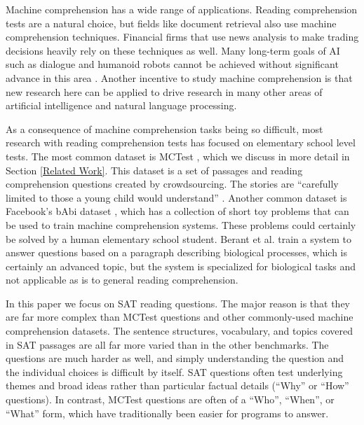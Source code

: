 \documentclass[pageno]{final_paper}
\begin{document}
Machine comprehension has a wide range of applications. Reading comprehension
tests are a natural choice, but fields like document retrieval also use machine
comprehension techniques. Financial firms that use news analysis to make
trading decisions heavily rely on these techniques as well. Many long-term
goals of AI such as dialogue and humanoid robots cannot be achieved without
significant advance in this area \cite{Weston2015}. Another incentive to
study machine comprehension is that new research here can be applied to drive
research in many other areas of artificial intelligence and natural language
processing.

As a consequence of machine comprehension tasks being so difficult, most
research with reading comprehension tests has focused on elementary school level
tests. The most common dataset is MCTest \cite{Richardson2013}, which we discuss
in more detail in Section \ref{Related Work}. This dataset is a set of passages
and reading comprehension questions created by crowdsourcing. The stories are
``carefully limited to those a young child would understand''
\cite{Richardson2013}. Another common dataset is Facebook's bAbi dataset
\cite{Weston2015}, which has a collection of short toy problems that can be used
to train machine comprehension systems. These problems could certainly be solved
by a human elementary school student. Berant et al. \cite{Berant2014} train a
system to answer questions based on a paragraph describing biological processes,
which is certainly an advanced topic, but the system is specialized for
biological tasks and not applicable as is to general reading comprehension.

In this paper we focus on SAT reading questions. The major reason is that they
are far more complex than MCTest questions and other commonly-used machine
comprehension datasets. The sentence structures, vocabulary, and topics covered
in SAT passages are all far more varied than in the other benchmarks. The
questions are much harder as well, and simply understanding the question and the
individual choices is difficult by itself. SAT questions often test underlying
themes and broad ideas rather than particular factual details (``Why'' or
``How'' questions). In contrast, MCTest questions are often of a ``Who'',
``When'', or ``What'' form, which have traditionally been easier for programs to
answer.
\end{document}
